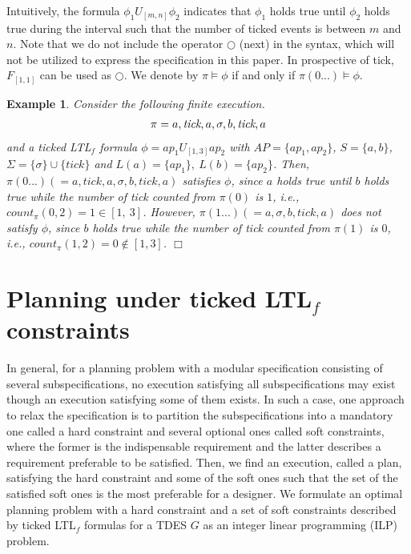 \documentclass[journal,twoside,web]{IEEEtran}
\newcommand{\qedwhite}{\hfill \ensuremath{\Box}}
\newtheorem{exa}{Example}
\begin{document}
Intuitively, the formula $\phi_1 U_{[m,n]}  \phi_2$ indicates that $\phi_1$ holds true until $\phi_2$ holds true during the interval such that the number of ticked events is between $m$ and $n$. 
Note that we do not include the operator $\bigcirc$ (next) in the syntax, which will not be utilized to express the specification in this paper. In prospective of tick, $F_{[1,1]}$ can be used as $\bigcirc$. 
We denote by $\pi \models \phi$ if and only if $\pi (0...) \models \phi$.

\begin{exa}
Consider the following finite execution.
\begin{align}
\pi=a,\textit{tick},a,\sigma,b,\textit{tick},a \notag
\end{align}
and a ticked LTL$_f$ formula $\phi=ap_1 U_{[1,3]} ap_2$ with $AP=\{ap_1,ap_2\}$, $S=\{a,b\}$, $\Sigma=\{\sigma\}\cup\{\textit{tick}\}$ and $L(a)=\{ap_1\},\ L(b)=\{ap_2\}$. Then, $\pi(0...) (= a,\textit{tick},a,\sigma,b,\textit{tick},a)$ satisfies $\phi$, since $a$ holds true until $b$ holds true while the number of \textit{tick} counted from $\pi(0)$ is $1$, i.e., $count_{\pi}(0, 2) = 1 \in[ 1,\ 3]$. However, $\pi (1...) (= a,\sigma,b,\textit{tick},a)$ does \textit{not} satisfy $\phi$, since $b$ holds true while the number of \textit{tick} counted from $\pi(1)$ is $0$, i.e., $count_{\pi}(1, 2) = 0 \notin [1, 3]$. \qedwhite 
\end{exa}




\section{Planning under ticked LTL$_f$ constraints}\label{sec4}
%
In general, for a planning problem with a modular specification consisting of several subspecifications, no execution satisfying all subspecifications may exist though an execution satisfying some of them exists. 
In such a case, one approach to relax the specification is to partition the subspecifications into a mandatory one called a hard constraint and several optional ones called soft constraints, where the former is the indispensable requirement and the latter describes a requirement preferable to be satisfied.  Then, we find an execution, called a plan, satisfying the hard constraint and some of the soft ones such that the set of the satisfied soft ones is the most preferable for a designer. 
We formulate an optimal planning problem with a hard constraint and a set of soft constraints described by  ticked LTL$_f$ formulas for a TDES $G$ as an integer linear programming (ILP) problem.
\end{document}
